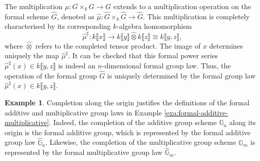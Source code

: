\documentclass{report}
\theoremstyle{definition}
\newtheorem{example}[theorem]{Example}
\begin{document}
The multiplication $\mu:G\times_kG\rightarrow G$ extends to a multiplication operation on the formal scheme $\widehat{G}$, denoted as $\widehat{\mu}:\widehat{G}\times_k\widehat{G}\rightarrow\widehat{G}$. This multiplication is completely characterised by its corresponding $k$-algebra homomorphism
\[\widehat{\mu}^{\sharp}:k\llbracket x\rrbracket\longrightarrow k\llbracket y\rrbracket\widehat{\otimes}k\llbracket z\rrbracket\cong k\llbracket y,z\rrbracket,\]
where $\widehat{\otimes}$ refers to the completed tensor product. The image of $x$ determines uniquely the map $\widehat{\mu}^{\sharp}$. It can be checked that this formal power series $\widehat{\mu}^{\sharp}(x)\in k\llbracket y,z\rrbracket$ is indeed an $n$-dimensional formal group law. Thus, the operation of the formal group $\widehat{G}$ is uniquely determined by the formal group law $\widehat{\mu}^{\sharp}(x)\in k\llbracket y,z\rrbracket$.

\begin{example}
Completion along the origin justifies the definitions of the formal additive and multiplicative group laws in Example \ref{exa:formal-additive-multiplicative}. Indeed, the completion of the additive group scheme $\mathbb{G}_a$ along its origin is the formal additive group, which is represented by the formal additive group law $\widehat{\mathbb{G}}_a$. Likewise, the completion of the multiplicative group scheme $\mathbb{G}_m$ is represented by the formal multiplicative group law $\widehat{\mathbb{G}}_m$.
\end{example}
\end{document}
